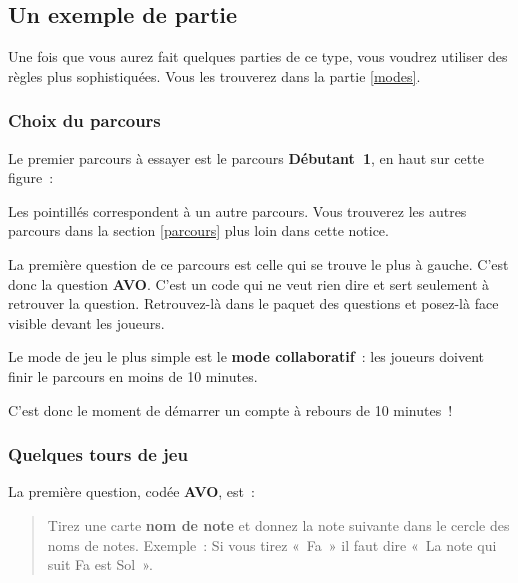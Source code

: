 \documentclass[11pt]{article}
\newcommand{\carte}[1]
{\textbf{#1}}
\newcommand{\parcours}[1]
{\textbf{#1}}
\newcommand{\QST}[1]
{\textbf{#1}}
\newcommand{\AVO}[0]
{Tirez une carte \carte{nom de note} et donnez la note suivante dans le cercle
des noms de notes. Exemple : Si vous tirez « Fa » il faut dire « La note qui
suit Fa est Sol ».}
\newcommand{\mode}[1]
{\textbf{#1}}
\begin{document}
\subsection{Un exemple de partie}

Une fois que vous aurez fait quelques parties de ce type, vous voudrez utiliser
des règles plus sophistiquées. Vous les trouverez dans la partie \ref{modes}.

\subsubsection{Choix du parcours}

Le premier parcours à essayer est le parcours \parcours{Débutant 1}, en haut
sur cette figure :


Les pointillés correspondent à un autre parcours. Vous trouverez les autres
parcours dans la section \ref{parcours} plus loin dans cette notice.

La première question de ce parcours est celle qui se trouve le plus à gauche.
C’est donc la question \QST{AVO}. C’est un code qui ne veut rien dire et sert
seulement à retrouver la question. Retrouvez-là dans le paquet des questions
et posez-là face visible devant les joueurs.

Le mode de jeu le plus simple est le \mode{mode collaboratif} : les joueurs
doivent finir le parcours en moins de 10 minutes.

C’est donc le moment de démarrer un compte à rebours de 10 minutes !

\subsubsection{Quelques tours de jeu}

La première question, codée \QST{AVO}, est :

\begin{quote}
\AVO
\end{quote}
\end{document}
